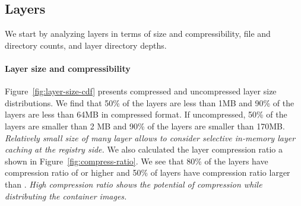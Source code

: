 \subsection{Layers}
\label{sec:layers}

We start by analyzing layers in terms of size and compressibility, file and
directory counts, and layer directory depths.

\paragraph{Layer size and compressibility}



Figure~\ref{fig:layer-size-cdf} presents compressed and uncompressed layer size
distributions.
%
%
We find that 50\% of the layers are less than 1MB and 90\% of the layers are
less than 64MB in compressed format.
%
%
If uncompressed, 50\% of the layers are smaller than 2 MB and 90\% of the
layers are smaller than 170MB.
%
%
\emph{Relatively small size of many layer allows to consider selective
in-memory layer caching at the registry side.}
%
We also calculated the layer compression ratio a shown in
Figure~\ref{fig:compress-ratio}.
%
We see that 80\% of the layers have compression ratio of  or
higher and 50\% of layers have compression ratio larger than .
%
\emph{High compression ratio shows the potential of compression while
distributing the container images.}
%

%
%
%
%

